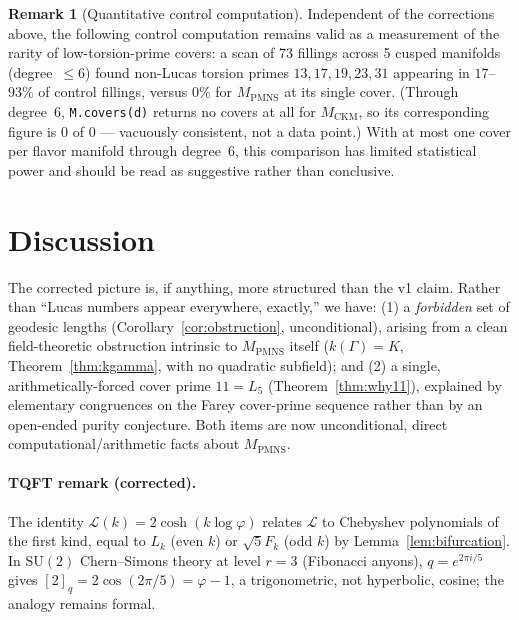 \documentclass[12pt]{article}
\theoremstyle{definition}
\newtheorem{remark}[theorem]{Remark}
\newcommand{\ph}{\varphi}
\newcommand{\Lcal}{\mathcal{L}}
\newcommand{\logph}{\log\ph}
\begin{document}
\begin{remark}[Quantitative control computation]
\label{rem:controls}
Independent of the corrections above, the following control
computation remains valid as a measurement of the rarity of
low-torsion-prime covers: a scan of 73 fillings across 5 cusped
manifolds (degree~$\leq6$) found non-Lucas torsion primes
$13,17,19,23,31$ appearing in $17$--$93\%$ of control fillings,
versus $0\%$ for $M_{\mathrm{PMNS}}$ at its single cover. (Through
degree~6, \texttt{M.covers(d)} returns no covers at all for
$M_{\mathrm{CKM}}$, so its corresponding figure is $0$ of $0$ ---
vacuously consistent, not a data point.) With at most one cover per
flavor manifold through degree~6, this comparison has limited
statistical power and should be read as suggestive rather than
conclusive.
\end{remark}

\section{Discussion}

The corrected picture is, if anything, more structured than the v1
claim. Rather than ``Lucas numbers appear everywhere, exactly,'' we
have: (1) a \emph{forbidden} set of geodesic lengths
(Corollary~\ref{cor:obstruction}, unconditional), arising from a clean
field-theoretic obstruction intrinsic to $M_{\mathrm{PMNS}}$ itself
($k(\Gamma)=K$, Theorem~\ref{thm:kgamma}, with no quadratic
subfield); and (2) a single, arithmetically-forced cover prime
$11=L_5$ (Theorem~\ref{thm:why11}), explained by elementary
congruences on the Farey cover-prime sequence rather than by an
open-ended purity conjecture. Both items are now unconditional,
direct computational/arithmetic facts about $M_{\mathrm{PMNS}}$.

\paragraph{TQFT remark (corrected).} The identity
$\Lcal(k)=2\cosh(k\logph)$ relates $\Lcal$ to Chebyshev polynomials of
the first kind, equal to $L_k$ (even $k$) or $\sqrt5F_k$ (odd $k$) by
Lemma~\ref{lem:bifurcation}. In $\mathrm{SU}(2)$ Chern--Simons theory
at level $r=3$ (Fibonacci anyons), $q=e^{2\pi i/5}$ gives
$[2]_q=2\cos(2\pi/5)=\ph-1$, a trigonometric, not hyperbolic, cosine;
the analogy remains formal.
\end{document}
